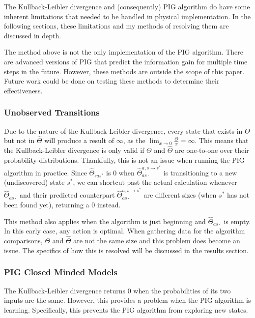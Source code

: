 \documentclass[12pt]{thesis}
\begin{document}
The Kullback-Leibler divergence and (consequently) PIG algorithm do have some inherent limitations that needed to be handled in physical implementation. In the following sections, these limitations and my methods of resolving them are discussed in depth.

The method above is not the only implementation of the PIG algorithm. There are advanced versions of PIG that predict the information gain for multiple time steps in the future. However, these methods are outside the scope of this paper. Future work could be done on testing these methods to determine their effectiveness.

\subsubsection{Unobserved Transitions}
Due to the nature of the Kullback-Leibler divergence, every state that exists in $\Theta$ but not in $\hat{\Theta}$ will produce a result of $\infty$, as the $\lim_{x \rightarrow 0} \frac{\Theta}{x} = \infty$. This means that the Kullback-Leibler divergence is only valid if $\Theta$ and $\hat{\Theta}$ are one-to-one over their probability distributions. Thankfully, this is not an issue when running the PIG algorithm in practice. Since $\hat{\Theta}_{sas^{*}}$ is 0 when $\hat{\Theta}_{as\cdot}^{a,s \rightarrow s^{*}}$ is transitioning to a new (undiscovered) state $s^{*}$, we can shortcut past the actual calculation whenever  $\hat{\Theta}_{as\cdot}$ and their predicted counterpart $\hat{\Theta}_{as\cdot}^{a,s \rightarrow s^{*}}$ are different sizes (when $s^{*}$ has not been found yet), returning a 0 instead.

This method also applies when the algorithm is just beginning and $\hat{\Theta}_{as\cdot}$ is empty. In this early case, any action is optimal. When gathering data for the algorithm comparisons, $\Theta$ and $\hat{\Theta}$ are not the same size and this problem does become an issue. The specifics of how this is resolved will be discussed in the results section.

\subsubsection{PIG Closed Minded Models}
The Kullback-Leibler divergence returns 0 when the probabilities of its two inputs are the same. However, this provides a problem when the PIG algorithm is learning. Specifically, this prevents the PIG algorithm from exploring new states.
\end{document}
